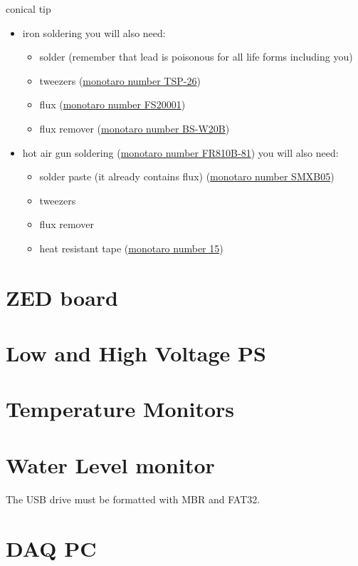 conical tip
\begin{itemize}
\item iron soldering you will also need:
  \begin{itemize}
  \item solder (remember that lead is poisonous for all life forms including
    you)
  \item tweezers
    (\href{https://www.monotaro.com/p/0840/4873/?displayId=5}{monotaro number
      TSP-26})
  \item flux (\href{https://www.monotaro.com/p/3952/8833/?displayId=5}{monotaro
      number FS20001})
  \item flux remover
    (\href{https://www.monotaro.com/p/6215/1382/?displayId=5}{monotaro number
      BS-W20B})
  \end{itemize}
\item hot air gun soldering
  (\href{https://www.monotaro.com/p/4893/0954/?displayId=5}{monotaro number
    FR810B-81}) you will also need:
  \begin{itemize}
  \item solder paste (it already contains flux)
    (\href{https://www.monotaro.com/p/1001/3097/?displayId=5}{monotaro number
      SMXB05})
  \item tweezers
  \item flux remover
  \item heat resistant tape
    (\href{https://www.monotaro.com/p/5638/8526/?displayId=5}{monotaro number
      15})
  \end{itemize}
\end{itemize}

\section{ZED board}
\section{Low and High Voltage PS}
\section{Temperature Monitors}
\section{Water Level monitor}
The USB drive must be formatted with MBR and FAT32.
\section{DAQ PC}

